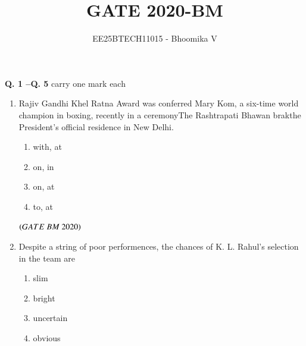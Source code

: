 \documentclass[journal,12pt,onecolumn]{IEEEtran}
\theoremstyle{remark}
\begin{document}
\title{GATE 2020-BM}
\author{EE25BTECH11015 - Bhoomika V}
\maketitle
\renewcommand{\thefigure}{\theenumi}
\renewcommand{\thetable}{\theenumi}


\noindent \textbf{Q. 1 --Q.  \textbf{5}} carry one mark each
\begin{enumerate}

\item Rajiv Gandhi Khel Ratna Award was conferred\underline{\hspace{2cm}} Mary Kom, a six-time world champion in boxing, recently in a ceremony\underline{\hspace{2cm}}The Rashtrapati Bhawan brak{the President's official residence} in New Delhi.

\begin{enumerate}

\item\hspace{0.5cm}with, at
\item\hspace{0.5cm}on, in
\item\hspace{0.5cm}on, at 
\item\hspace{0.5cm}to, at
\end{enumerate}

\hfill $\left(GATE\ BM\ 2020\right)$


\item Despite a string of poor performences, the chances of K. L. Rahul's selection in the team are\underline {\hspace{2cm}}
\begin{enumerate}
    \item \hspace{0.5cm}slim
    \item \hspace{0.5cm}bright
    \item \hspace{0.5cm}uncertain
    \item \hspace{0.5cm}obvious


\end{enumerate}
\end{enumerate}
\end{document}
